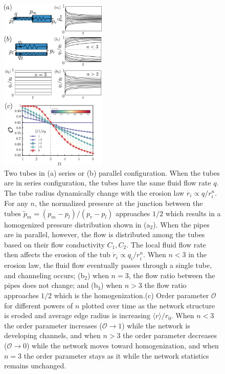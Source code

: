 \documentclass[%
 reprint,
 amsmath,amssymb,
 aps,
]{revtex4-1}
\begin{document}
\begin{figure}[!h]
    \includegraphics[width = 0.45\textwidth]{Figs/Fig3_new.png}
    \caption{Two tubes in (a) series  or (b) parallel configuration. When the tubes are in series configuration, the tubes have the same fluid flow rate $q$. The tube radius dynamically change with the erosion law $\dot{r_i}\propto q/r_i^n$. For any $n$, the normalized pressure at the junction between the tubes $\tilde p_m = (p_m - p_l)/(p_r-p_l)$ approaches $1/2$ which results in a homogenized pressure distribution  shown in (a$_2$). When the pipes are in parallel, however, the flow is distributed among the tubes based on their flow conductivity $C_1,C_2$. The local fluid flow rate then affects the erosion of the tub $\dot{r}_i\propto q_i/r_i^n$. When $n<3$ in the erosion law, the fluid flow eventually passes through a single tube, and channeling occurs; (b$_2$) when $n=3$, the flow ratio between the pipes does not change; and (b$_3$) when $n>3$ the flow ratio approaches $1/2$ which is the homogenization.(c) Order parameter $\mathcal{O}$ for different powers of $n$ plotted over time as the network structure is eroded and average edge radius is increasing $\langle r\rangle/r_0$. When $n<3$ the order parameter increases ($\mathcal{O}\to 1$) while the network is developing channels, and when $n>3$ the order parameter decreases ($\mathcal{O}\to 0$) while the network moves toward homogenization, and when $n=3$ the order parameter stays as it while the network statistics remains unchanged.}\label{fig:fig3}
\end{figure}
\end{document}
